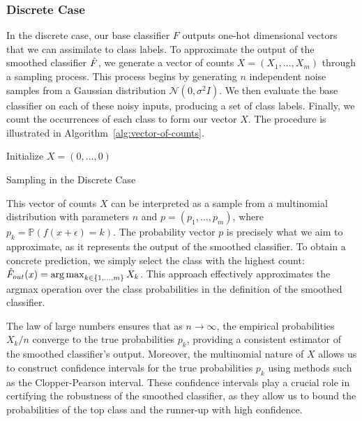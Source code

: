 \subsubsection{Discrete Case}\label{subsubsec:discrete-case-monte-carlo-simulation}
In the discrete case, our base classifier $F$ outputs one-hot dimensional vectors that we can assimilate to class labels.
To approximate the output of the smoothed classifier $\Hat{F}$, we generate a vector of counts $X = (X_1, \ldots, X_m)$ through a sampling process.
This process begins by generating $n$ independent noise samples from a Gaussian distribution $\mathcal{N}(0, \sigma^2 I)$.
We then evaluate the base classifier on each of these noisy inputs, producing a set of class labels.
Finally, we count the occurrences of each class to form our vector $X$.
The procedure is illustrated in Algorithm~\ref{alg:vector-of-counts}.
\begin{algorithm}[h]
    \DontPrintSemicolon %
    Initialize $X = (0, \ldots, 0)$\;
    \caption{Sampling in the Discrete Case}\label{alg:vector-of-counts}
\end{algorithm}

This vector of counts $X$ can be interpreted as a sample from a multinomial distribution with parameters $n$ and $p = (p_1, \ldots, p_m)$, where $p_k = \mathbb{P}(f(x + \epsilon) = k)$.
The probability vector $p$ is precisely what we aim to approximate, as it represents the output of the smoothed classifier.
To obtain a concrete prediction, we simply select the class with the highest count: $\hat{F}_{out}(x) = \operatorname*{arg\,max}_{k \in \{1, \ldots, m\}} X_k$.
This approach effectively approximates the argmax operation over the class probabilities in the definition of the smoothed classifier.

The law of large numbers ensures that as $n \rightarrow \infty$, the empirical probabilities $X_k / n$ converge to the true probabilities $p_k$, providing a consistent estimator of the smoothed classifier's output.
Moreover, the multinomial nature of $X$ allows us to construct confidence intervals for the true probabilities $p_k$ using methods such as the Clopper-Pearson interval.
These confidence intervals play a crucial role in certifying the robustness of the smoothed classifier, as they allow us to bound the probabilities of the top class and the runner-up with high confidence.

